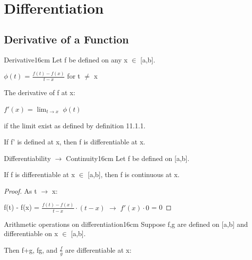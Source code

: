 \newpage

\section[Day 12: Differentiation]{ Differentiation }

\subsection{ Derivative of a Function }

    \begin{definition}{Derivative}{16cm}
        Let f be defined on any x $\in$ [a,b].

        \hspace{1cm}
        $\phi(t)$ = $\frac{f(t) - f(x)}{t - x}$ for t $\not =$ x
        
        The {\color{lblue} derivative} of f at x:

        \hspace{1cm}
        $f'(x)$ = $\lim_{t \rightarrow x}$ $\phi(t)$

        if the limit exist as defined by {\color{blue} definition 11.1.1}.

        If f' is defined at x, then f is differentiable at x.
    \end{definition}

    \vspace{0.5cm}



    \begin{wtheorem}{Differentiability $\rightarrow$ Continuity}{16cm}
        Let f be defined on [a,b].
        
        If f is differentiable at x $\in$ [a,b], then f is continuous at x.        
    \end{wtheorem}

    \begin{proof}
        As t $\rightarrow$ x:

        \hspace{1cm}
        f(t) - f(x)
        = $\frac{f(t)- f(x)}{t-x} \cdot (t-x)$
        $\rightarrow$ $f'(x) \cdot 0$
        = 0
    \end{proof}

    \vspace{0.5cm}



    \begin{wtheorem}{Arithmetic operations on differentiation}{16cm}
        Suppose f,g are defined on [a,b] and differentiable on
        x $\in$ [a,b].
        
        Then f+g, fg, and $\frac{f}{g}$ are differentiable at x:        
    \end{wtheorem}

